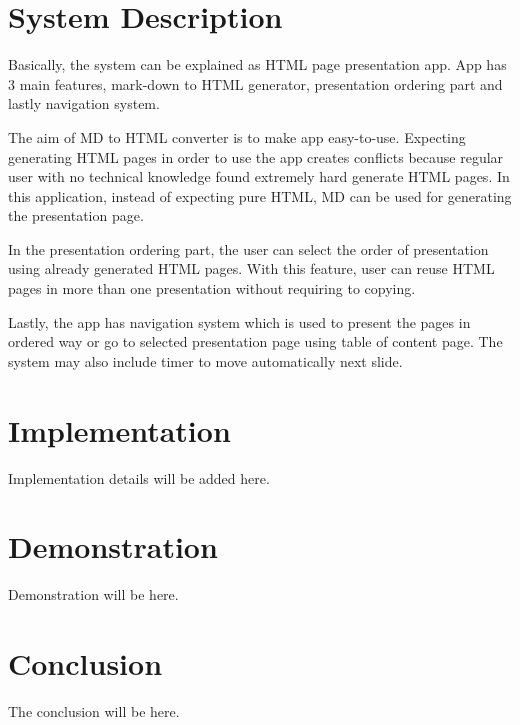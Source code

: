 \documentclass[journal,comsoc]{IEEEtran}
\begin{document}
\section{System Description}

Basically, the system can be explained as HTML page presentation app. App has 3 main features, mark-down to HTML generator, presentation ordering part and lastly navigation system.

The aim of MD to HTML converter is to make app easy-to-use. Expecting generating HTML pages in order to use the app creates conflicts because regular user with no technical knowledge found extremely hard generate HTML pages. In this application, instead of expecting pure HTML, MD can be used for generating the presentation page.

In the presentation ordering part, the user can select the order of presentation using already generated HTML pages. With this feature, user can reuse HTML pages in more than one presentation without requiring to copying. 

Lastly, the app has navigation system which is used to present the pages in ordered way or go to selected presentation page using table of content page. The system may also include timer to move automatically next slide.






\section{Implementation}
Implementation details will be added here.

\section{Demonstration}
Demonstration will be here.

\section{Conclusion}
The conclusion will be here.










% 
% 
\end{document}
